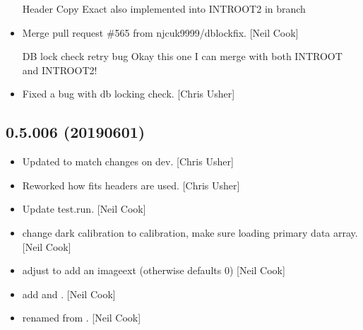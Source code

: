 \documentclass[a4paper,10pt,english]{report}
\begin{document}
\begin{itemize}
Header Copy Exact \textendash{} also implemented into INTROOT2 in  branch

\item {} 
Merge pull request \#565 from njcuk9999/db\sphinxhyphen{}lock\sphinxhyphen{}fix. {[}Neil Cook{]}

DB lock check retry bug \sphinxhyphen{} Okay this one I can merge with both INTROOT and INTROOT2!

\item {} 
Fixed a bug with db locking check. {[}Chris Usher{]}

\end{itemize}


\subsection{0.5.006 (2019\sphinxhyphen{}06\sphinxhyphen{}01)}
\label{\detokenize{misc/changelog:id149}}\begin{itemize}
\item {} 
Updated to match changes on dev. {[}Chris Usher{]}

\item {} 
Reworked how fits headers are used. {[}Chris Usher{]}

\item {} 
Update test.run. {[}Neil Cook{]}

\item {} 
 \sphinxhyphen{} change dark calibration to  calibration,
make sure  loading primary data array. {[}Neil Cook{]}

\item {} 
 \sphinxhyphen{} adjust  to add an imageext (otherwise
defaults 0) {[}Neil Cook{]}

\item {} 
 \sphinxhyphen{} add  and . {[}Neil
Cook{]}

\item {} 
 \sphinxhyphen{} renamed from . {[}Neil
Cook{]}

\end{itemize}
\end{document}

